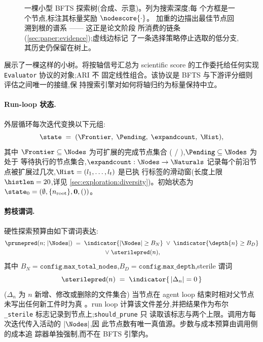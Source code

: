 \begin{figure}[t]
  \centering
  \resizebox{\columnwidth}{!}{}
  \caption{一棵小型 BFTS 探索树(合成、示意)。列为搜索深度;每
           个方框是一个节点,标注其标量奖励 $\nodescore{\cdot}$。
           加重的边描出最佳节点回溯到根的谱系 —— 这正是论文阶段
           所消费的链条(\cref{sec:paper:evidence});虚线边标记
           了一条选择策略停止选取的低分支,其历史仍保留在树上。}
  \label{fig:tree}
\end{figure}

 展示了一棵这样的小树。将按轴信号汇总为 scientific
score 的工作委托给任何实现 \texttt{Evaluator} 协议的对象;ARI 不
固定线性组合。该协议是 BFTS 与下游评分细则评估之间唯一的接缝,保
持搜索引擎对如何将轴归约为标量保持中立。

\paragraph{Run-loop 状态.}
外层循环每次迭代变换以下元组:
\[
  \state \;=\; (\Frontier,\;\Pending,\;\expandcount,\;\Hist),
\]
其中 $\Frontier\subseteq\Nodes$ 为可扩展的完成节点集合
(\StateDone{} / \StateFailed{}),$\Pending\subseteq\Nodes$ 为
处于 \StateOpen{} 等待执行的节点集合,$\expandcount:\Nodes\to\Naturals$
记录每个前沿节点被扩展过几次,$\Hist=(l_1,\ldots,l_t)$ 是已执
行标签的滑动窗(长度上限 $\histlen=20$,详见
\cref{sec:exploration:diversity})。初始状态为
$\state_0=(\emptyset,\{n_\mathrm{root}\},\mathbf{0},())$。

\paragraph{剪枝谓词.}
硬性探索预算由如下谓词表达:
\begin{multline}\label{eq:prune}
  \prunepred(n;\,|\Nodes|) \;=\;
    \indicator{|\Nodes| \geq B_N}
    \;\lor\;
    \indicator{\depth{n} \geq B_D}
    \\\;\lor\;
    \sterilepred(n),
\end{multline}
其中 $B_N = \texttt{config.max\_total\_nodes}$,$B_D =
\texttt{config.max\_depth}$,sterile 谓词
\begin{equation}\label{eq:sterile}
  \sterilepred(n) \;=\; \indicator{\,|\Delta_n| = 0\,}
\end{equation}
($\Delta_n$ 为 $n$ 新增、修改或删除的文件集合)
当节点在 agent loop 结束时相对父节点未写出任何新工件时为真
。run loop 计算该文件差分,并把结果作为布尔
\texttt{\_sterile} 标志记录到节点上;\texttt{should\_prune} 只
读取该标志与两个上限。调用方每次迭代传入活动的 $|\Nodes|$,因
此节点数有唯一真值源。步数与成本预算由调用侧的成本追
踪器单独强制,而不在 BFTS 引擎内。

